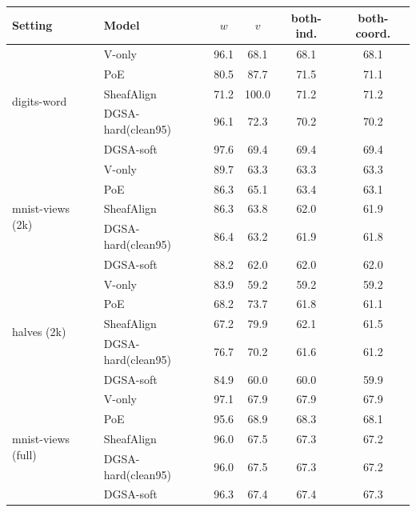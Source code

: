 \small
\begin{tabular}{llcccc}
\toprule
Setting & Model & $w$ & $v$ & both-ind. & both-coord. \\
\midrule
\multirow{5}{*}{digits-word} & V-only & 96.1 & 68.1 & 68.1 & 68.1 \\
 & PoE & 80.5 & 87.7 & 71.5 & 71.1 \\
 & SheafAlign & 71.2 & 100.0 & 71.2 & 71.2 \\
 & DGSA-hard(clean95) & 96.1 & 72.3 & 70.2 & 70.2 \\
 & DGSA-soft & 97.6 & 69.4 & 69.4 & 69.4 \\
\midrule
\multirow{5}{*}{mnist-views (2k)} & V-only & 89.7 & 63.3 & 63.3 & 63.3 \\
 & PoE & 86.3 & 65.1 & 63.4 & 63.1 \\
 & SheafAlign & 86.3 & 63.8 & 62.0 & 61.9 \\
 & DGSA-hard(clean95) & 86.4 & 63.2 & 61.9 & 61.8 \\
 & DGSA-soft & 88.2 & 62.0 & 62.0 & 62.0 \\
\midrule
\multirow{5}{*}{halves (2k)} & V-only & 83.9 & 59.2 & 59.2 & 59.2 \\
 & PoE & 68.2 & 73.7 & 61.8 & 61.1 \\
 & SheafAlign & 67.2 & 79.9 & 62.1 & 61.5 \\
 & DGSA-hard(clean95) & 76.7 & 70.2 & 61.6 & 61.2 \\
 & DGSA-soft & 84.9 & 60.0 & 60.0 & 59.9 \\
\midrule
\multirow{5}{*}{mnist-views (full)} & V-only & 97.1 & 67.9 & 67.9 & 67.9 \\
 & PoE & 95.6 & 68.9 & 68.3 & 68.1 \\
 & SheafAlign & 96.0 & 67.5 & 67.3 & 67.2 \\
 & DGSA-hard(clean95) & 96.0 & 67.5 & 67.3 & 67.2 \\
 & DGSA-soft & 96.3 & 67.4 & 67.4 & 67.3 \\
\bottomrule
\end{tabular}
